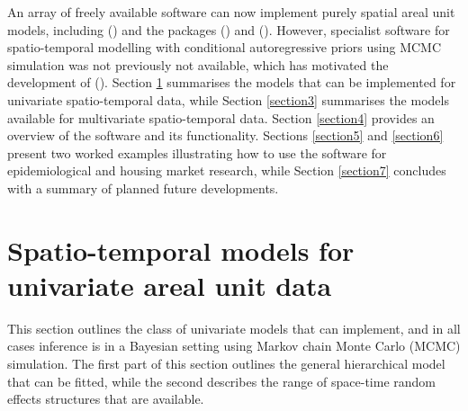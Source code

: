 \documentclass[article, nojss]{jss}
\begin{document}
\hspace{1cm} An array of freely available software can now implement purely spatial areal unit models, including  (\citealp{lunn2009}) and the  packages   (\citealp{lee2013}) and  (\citealp{rue2009}).  However, specialist software for spatio-temporal modelling with conditional autoregressive priors  using MCMC simulation was not previously not available, which has  motivated the development of  (\citealp{lee2018}). Section \ref{section2} summarises the models that can be implemented for univariate spatio-temporal data, while Section \ref{section3} summarises the models available for multivariate spatio-temporal data. Section \ref{section4} provides an overview of the software and its functionality. Sections \ref{section5} and \ref{section6} present two worked examples illustrating how to use the software for epidemiological and housing market research, while Section \ref{section7} concludes with a summary of planned future developments.



\section{Spatio-temporal models for univariate areal unit data}\label{section2}
This section outlines the class of univariate models that  can implement, and in all cases inference is in a Bayesian setting using Markov chain Monte Carlo (MCMC) simulation. The first part of this section outlines the general hierarchical model that can be fitted, while the second describes the range of space-time random effects structures that are available.
\end{document}
